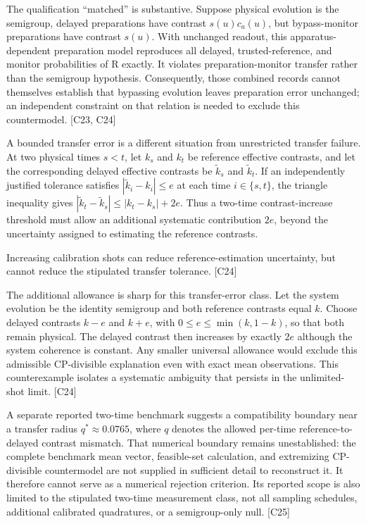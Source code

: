 \documentclass[11pt]{article}
\begin{document}
The qualification \textquotedblleft{}matched\textquotedblright{} is substantive. Suppose physical evolution is the semigroup, delayed preparations have contrast $s(u)c_a(u)$, but bypass-monitor preparations have contrast $s(u)$. With unchanged readout, this apparatus-dependent preparation model reproduces all delayed, trusted-reference, and monitor probabilities of R exactly. It violates preparation-monitor transfer rather than the semigroup hypothesis. Consequently, those combined records cannot themselves establish that bypassing evolution leaves preparation error unchanged; an independent constraint on that relation is needed to exclude this countermodel. [C23, C24]

A bounded transfer error is a different situation from unrestricted transfer failure. At two physical times $s<t$, let $k_s$ and $k_t$ be reference effective contrasts, and let the corresponding delayed effective contrasts be $\widetilde k_s$ and $\widetilde k_t$. If an independently justified tolerance satisfies $|\widetilde k_i-k_i|\leq e$ at each time $i\in\{s,t\}$, the triangle inequality gives
$|\widetilde k_t-\widetilde k_s|\leq|k_t-k_s|+2e.$
Thus a two-time contrast-increase threshold must allow an additional systematic contribution $2e$, beyond the uncertainty assigned to estimating the reference contrasts.

Increasing calibration shots can reduce reference-estimation uncertainty, but cannot reduce the stipulated transfer tolerance. [C24]

The additional allowance is sharp for this transfer-error class. Let the system evolution be the identity semigroup and both reference contrasts equal $k$. Choose delayed contrasts $k-e$ and $k+e$, with $0\leq e\leq\min(k,1-k)$, so that both remain physical. The delayed contrast then increases by exactly $2e$ although the system coherence is constant. Any smaller universal allowance would exclude this admissible CP-divisible explanation even with exact mean observations. This counterexample isolates a systematic ambiguity that persists in the unlimited-shot limit. [C24]

A separate reported two-time benchmark suggests a compatibility boundary near a transfer radius $q^*\approx0.0765$, where $q$ denotes the allowed per-time reference-to-delayed contrast mismatch. That numerical boundary remains unestablished: the complete benchmark mean vector, feasible-set calculation, and extremizing CP-divisible countermodel are not supplied in sufficient detail to reconstruct it. It therefore cannot serve as a numerical rejection criterion. Its reported scope is also limited to the stipulated two-time measurement class, not all sampling schedules, additional calibrated quadratures, or a semigroup-only null. [C25]
\end{document}
